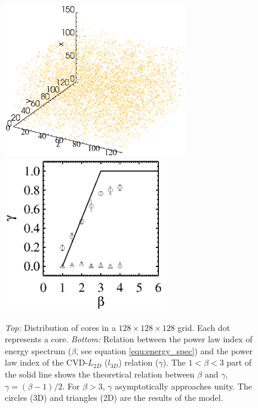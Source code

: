 \documentclass[iop,revtex4]{emulateapj}
\begin{document}
\setlength{\floatsep}{10pt plus 3pt minus 2pt}
\begin{figure}[htbp]
\includegraphics[width=8cm]{fft_simu_plot_core128.eps} \includegraphics[width=7cm]{beta_gamma128.eps}
\caption{ {\it Top:} Distribution of cores in a $128\times 128\times 128$ grid. Each dot represents a core. {\it Bottom:} Relation between the power law index of energy spectrum ($\beta$, see equation \ref{equ:energy_spec}) and the power law index of the CVD-$L_{2D}$ ($l_{3D}$) relation ($\gamma$). The $1< \beta <3$ part of the solid line shows the theoretical relation between $\beta$ and $\gamma$, $\gamma=(\beta-1)/2$. For $\beta>3$, $\gamma$ asymptotically approaches unity. The circles (3D) and triangles (2D) are the results of the model.
\label{core128}}
\end{figure}
\end{document}
